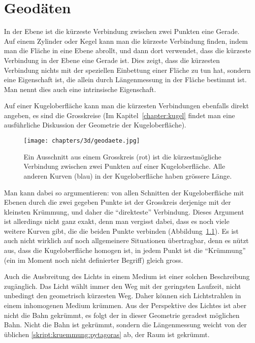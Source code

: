 %
%
\chapter{Geodäten
\label{skript:chapter:geodaeten}}
\rhead{}
In der Ebene ist die kürzeste Verbindung zwischen zwei Punkten
eine Gerade.
Auf einem Zylinder oder Kegel kann man die kürzeste Verbindung finden,
indem man die Fläche in eine Ebene abrollt, und dann dort verwendet,
dass die kürzeste Verbindung in der Ebene eine Gerade ist.
Dies zeigt, dass die kürzesten Verbindung nichts mit der speziellen
Einbettung einer Fläche zu tun hat, sondern eine Eigenschaft ist,
die allein durch Längenmessung in der Fläche bestimmt ist.
Man nennt dies auch eine intrinsische Eigenschaft.

Auf einer Kugeloberfläche kann man die kürzesten Verbindungen ebenfalls
direkt angeben, es sind die Grosskreise (Im Kapitel~\ref{chapter:kugel}
findet man eine ausführliche Diskussion der Geometrie der Kugeloberfläche).
\begin{figure}
\centering
\texttt{[image: chapters/3d/geodaete.jpg]}
\caption{Ein Ausschnitt aus einem Grosskreis (rot) ist die kürzestmögliche
Verbindung zwischen zwei Punkten auf einer Kugeloberfläche.
Alle anderen Kurven (blau) in der Kugeloberfläche haben grössere Länge.
\label{skript:kruemmung:fig:geodaete}}
\end{figure}
Man kann dabei so argumentieren: von allen Schnitten der Kugeloberfläche
mit Ebenen durch die zwei gegeben Punkte ist der Grosskreis derjenige
mit der kleinsten Krümmung, und daher die ``direkteste'' Verbindung.
Dieses Argument ist allerdings nicht ganz exakt, denn man vergisst dabei,
dass es noch viele weitere Kurven gibt, die die beiden Punkte verbinden
(Abbildung~\ref{skript:kruemmung:fig:geodaete}).
Es ist auch nicht wirklich auf noch allgemeinere Situationen übertragbar,
denn es nützt aus, dass die Kugeloberfläche homogen ist, in jedem Punkt
ist die ``Krümmung'' (ein im Moment noch nicht definierter Begriff) 
gleich gross.

Auch die Ausbreitung des Lichts in einem Medium ist einer solchen
Beschreibung zugänglich.
Das Licht wählt immer den Weg mit der geringsten Laufzeit, nicht
unbedingt den geometrisch kürzesten Weg.
Daher können sich Lichtstrahlen in einem inhomogenen Medium
krümmen.
Aus der Perspektive des Lichtes ist aber nicht die Bahn gekrümmt,
es folgt der in dieser Geometrie geradest möglichen Bahn.
Nicht die Bahn ist gekrümmt, sondern die Längenmessung weicht von
der üblichen \eqref{skript:kruemmung:pytagoras} ab, der Raum ist
gekrümmt.

